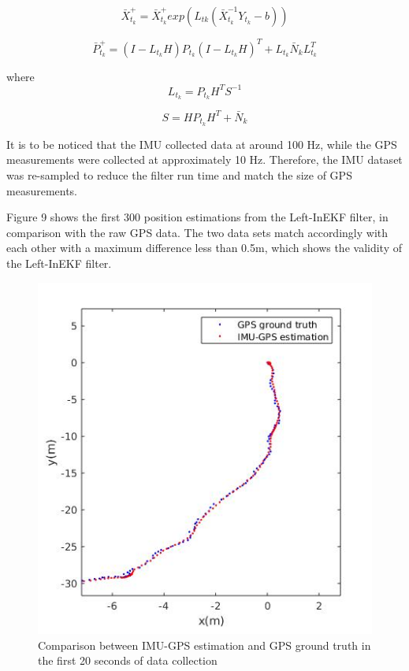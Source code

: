\begin{equation}
\bar{X}_{t_{k}}^+ = \bar{X}_{t_{k}}^+ 
exp(L_{tk} (\bar{X}_{t_{k}}^{-1}Y_{t_k}-b) )
\end{equation}

\begin{equation}
\bar{P}_{t_{k}}^+ = (I - L_{t_k} H )P_{t_k}(I - L_{t_k} H )^T
+L_{t_k}\bar{N}_{k}L_{t_k}^T
\end{equation}

where 
\begin{equation}
L_{t_k} = P_{t_{k}} H^T S^{-1}
\end{equation}

\begin{equation}
S = HP_{t_k} H^T + \bar{N}_{k}
\end{equation}

It is to be noticed that the IMU collected data at around 100 Hz, while the GPS measurements were collected at approximately 10 Hz. Therefore, the IMU dataset was re-sampled to reduce the filter run time and match the size of GPS measurements.

Figure 9 shows the first 300 position estimations from the Left-InEKF filter, in comparison with the raw GPS data. The two data sets match accordingly with each other with a maximum difference less than 0.5m, which shows the validity of the Left-InEKF filter. 

\begin{figure}[hbt!]
    \centering
    \includegraphics[width = 0.8\linewidth]{media/Starting_results.jpg}
    \caption{Comparison between IMU-GPS estimation and GPS ground truth in the first 20 seconds of data collection}
    \label{fig:first-20s}
\end{figure}

